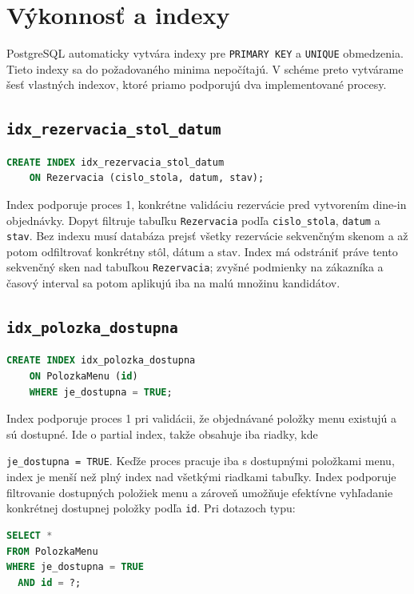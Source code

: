 \documentclass[11pt, a4paper]{article}
\begin{document}
\clearpage
\section{Výkonnosť a indexy}

PostgreSQL automaticky vytvára indexy pre \texttt{PRIMARY KEY} a \texttt{UNIQUE} obmedzenia.
Tieto indexy sa do požadovaného minima nepočítajú. V schéme preto vytvárame šesť vlastných
indexov, ktoré priamo podporujú dva implementované procesy.

\subsection*{\texttt{idx\_rezervacia\_stol\_datum}}

\begin{lstlisting}[language=SQL]
CREATE INDEX idx_rezervacia_stol_datum
    ON Rezervacia (cislo_stola, datum, stav);
\end{lstlisting}

Index podporuje proces 1, konkrétne validáciu rezervácie pred vytvorením dine-in objednávky.
Dopyt filtruje tabuľku \texttt{Rezervacia} podľa \texttt{cislo\_stola}, \texttt{datum} a
\texttt{stav}. Bez indexu musí databáza prejsť všetky rezervácie sekvenčným skenom a až potom
odfiltrovať konkrétny stôl, dátum a stav. Index má odstrániť práve tento sekvenčný sken nad
tabuľkou \texttt{Rezervacia}; zvyšné podmienky na zákazníka a časový interval sa potom aplikujú
iba na malú množinu kandidátov.

\subsection*{\texttt{idx\_polozka\_dostupna}}

\begin{lstlisting}[language=SQL]
CREATE INDEX idx_polozka_dostupna
    ON PolozkaMenu (id)
    WHERE je_dostupna = TRUE;

\end{lstlisting}

Index podporuje proces 1 pri validácii, že objednávané položky menu existujú a sú dostupné.
Ide o partial index, takže obsahuje iba riadky, kde

\texttt{je\_dostupna = TRUE}. Keďže proces pracuje iba s dostupnými položkami menu,
index je menší než plný index nad všetkými riadkami tabuľky.
Index podporuje filtrovanie dostupných položiek menu a zároveň umožňuje efektívne
vyhľadanie konkrétnej dostupnej položky podľa \texttt{id}. Pri dotazoch typu:
\begin{lstlisting}[language=SQL]
SELECT *
FROM PolozkaMenu
WHERE je_dostupna = TRUE
  AND id = ?;
\end{lstlisting}
\end{document}
